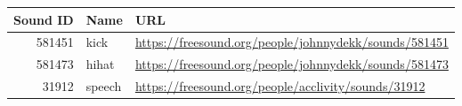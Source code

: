 \begin{tabular}{rll}
\toprule
Sound ID & Name & URL \\
\midrule
581451 & kick & \url{https://freesound.org/people/johnnydekk/sounds/581451} \\
581473 & hihat & \url{https://freesound.org/people/johnnydekk/sounds/581473} \\
31912 & speech & \url{https://freesound.org/people/acclivity/sounds/31912} \\
\bottomrule
\end{tabular}
